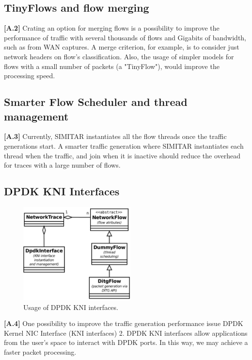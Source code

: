 \subsection{TinyFlows and flow merging}

\textbf{[A.2]} Crating an option for merging flows is a possibility to improve the performance of traffic with several thousands of flows and Gigabits of bandwidth, such as from WAN captures. A merge criterion, for example, is to consider just network headers on flow’s classification. Also, the usage of simpler models for flows with a small number of packets (a "TinyFlow"), would improve the processing speed.

\subsection{Smarter Flow Scheduler and thread management}

\textbf{[A.3]} Currently, SIMITAR instantiates all the flow threads once the traffic generations start.  A smarter traffic generation where SIMITAR instantiates each thread when the traffic, and join when it is inactive should reduce the overhead for traces with a large number of flows. 

\subsection{DPDK KNI Interfaces}

\begin{figure}[!ht]
    \centering
    \includegraphics[height=2.0in]{figures/ch6/dpdk-interface.pdf}
    \caption{Usage of DPDK KNI interfaces.}
    \label{fig:dpdk-kni}
\end{figure}

\textbf{[A.4]} One possibility to improve the traffic generation performance issue DPDK Kernel NIC Interface (\acrshort{KNI} interfaces) 2. DPDK KNI interfaces allow applications from the user’s space to interact with DPDK ports. In this way, we may achieve a faster packet processing.

